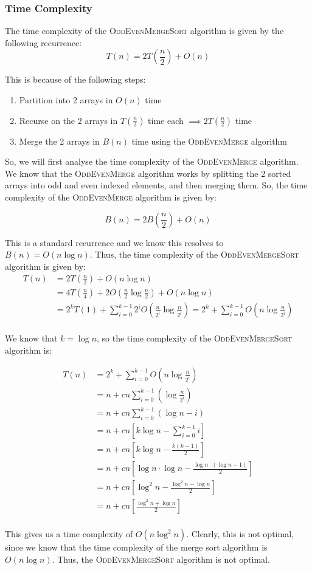 \documentclass[a4paper]{article}
\begin{document}
\newpage
\subsubsection*{Time Complexity}
The time complexity of the \textsc{OddEvenMergeSort} algorithm is given by the following recurrence:
\[
T(n) = 2T\left(\frac{n}{2}\right) + O(n)
\]

\noindent This is because of the following steps:
\begin{enumerate}
    \item Partition into 2 arrays in $O(n)$ time
    \item Recurse on the 2 arrays in $T\left(\frac{n}{2}\right)$ time each $\implies 2T\left(\frac{n}{2}\right)$ time
    \item Merge the 2 arrays in $B(n)$ time using the \textsc{OddEvenMerge} algorithm
\end{enumerate}

\noindent So, we will first analyse the time complexity of the \textsc{OddEvenMerge} algorithm. We know that the \textsc{OddEvenMerge} algorithm works by splitting the 2 sorted arrays into odd and even indexed elements, and then merging them. So, the time complexity of the \textsc{OddEvenMerge} algorithm is given by:

\[
B(n) = 2B\left(\frac{n}{2}\right) + O(n)
\]

\noindent This is a standard recurrence and we know this resolves to $B(n) = O(n \log n)$. Thus, the time complexity of the \textsc{OddEvenMergeSort} algorithm is given by:
\begin{align*}
    T(n) &= 2T\left(\frac{n}{2}\right) + O\left(n \log n\right) \\
    &= 4T\left(\frac{n}{4}\right) + 2O\left(\frac{n}{2} \log \frac{n}{2}\right) + O(n \log n) \\
    &= 2^kT\left(1\right) + \sum_{i=0}^{k-1} 2^i O\left(\frac{n}{2^i} \log \frac{n}{2^i}\right) = 2^k + \sum_{i=0}^{k-1} O\left(n \log \frac{n}{2^i}\right) \\
\end{align*}

\noindent We know that $k = \log n$, so the time complexity of the \textsc{OddEvenMergeSort} algorithm is:

\begin{align*}
    T(n) &= 2^k + \sum_{i=0}^{k-1} O\left(n \log \frac{n}{2^i}\right) \\
    &= n + cn\sum_{i=0}^{k-1} \left(\log \frac{n}{2^i}\right) \\
    &= n + cn\sum_{i=0}^{k-1} \left(\log n - i\right) \\
    &= n + cn\left[k \log n - \sum_{i=0}^{k-1} i \right]\\
    &= n + cn\left[k \log n - \frac{k(k-1)}{2} \right]\\
    &= n + cn\left[\log n \cdot \log n - \frac{\log n \cdot (\log n -1)}{2} \right]\\
    &= n + cn\left[\log^2 n - \frac{\log^2 n - \log n}{2} \right]\\
    &= n + cn\left[\frac{\log^2 n + \log n}{2} \right]\\
\end{align*}

\noindent This gives us a time complexity of $O(n \log^2 n)$. Clearly, this is not optimal, since we know that the time complexity of the merge sort algorithm is $O(n \log n)$. Thus, the \textsc{OddEvenMergeSort} algorithm is not optimal.
\end{document}
